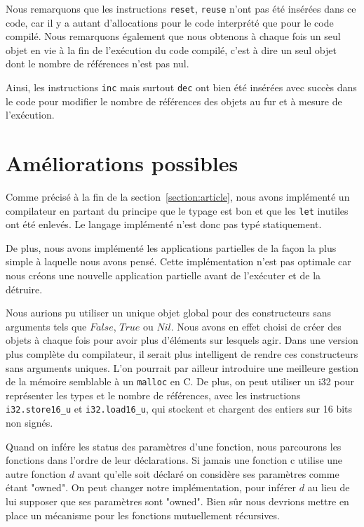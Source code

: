 \documentclass{rapportECL}
\begin{document}
Nous remarquons que les instructions \verb|reset|, \verb|reuse| n'ont pas été insérées dans ce code, car il y a autant d'allocations pour le code interprété que pour le code compilé. Nous remarquons également que nous obtenons à chaque fois un seul objet en vie à la fin de l'exécution du code compilé, c'est à dire un seul objet dont le nombre de références n'est pas nul. 

Ainsi, les instructions \verb|inc| mais surtout \verb|dec| ont bien été insérées avec succès dans le code pour modifier le nombre de références des objets au fur et à mesure de l'exécution.

\section{Améliorations possibles}

Comme précisé à la fin de la section~\ref{section:article}, nous avons implémenté un compilateur en partant du principe que le 
typage est bon et que les \verb|let| inutiles ont été enlevés. Le langage implémenté n'est donc pas typé statiquement.

De plus, nous avons implémenté les applications partielles de la façon la plus simple à laquelle nous avons pensé. 
Cette implémentation n'est pas optimale car nous créons une nouvelle application partielle avant de l'exécuter et de la détruire.

Nous aurions pu utiliser un unique objet global pour des constructeurs sans arguments tels que $False$, $True$ ou $Nil$. 
Nous avons en effet choisi de créer des objets à chaque fois pour avoir plus d'éléments sur lesquels agir. Dans une 
version plus complète du compilateur, il serait plus intelligent de rendre ces constructeurs sans arguments uniques. L'on 
pourrait par ailleur introduire une meilleure gestion de la mémoire semblable à un \verb|malloc| en C. De plus, on peut 
utiliser un i32 pour représenter les types et le nombre de références, avec les instructions \verb|i32.store16_u| et \verb|i32.load16_u|, qui stockent et chargent des entiers sur 16 bits non signés.

Quand on infére les status des paramètres d'une fonction, nous parcourons les fonctions dans l'ordre de leur déclarations. 
Si jamais une fonction c utilise une autre fonction $d$ avant qu'elle soit déclaré on considère ses paramètres comme étant "owned".
On peut changer notre implémentation, pour inférer $d$ au lieu de lui supposer que ses paramètres sont "owned".
Bien sûr nous devrions mettre en place un mécanisme pour les fonctions mutuellement récursives.


\newpage

\printbibliography
\end{document}
